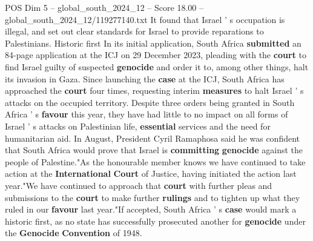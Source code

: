 \begin{textsample}{POS Dim 5 – global\_south\_2024\_12 – Score 18.00 – global\_south\_2024\_12/119277140.txt}
It found that Israel ' s occupation is illegal, and set out clear standards for Israel to provide reparations to Palestinians.
Historic first In its initial application, South Africa \textbf{submitted} an 84-page application at the ICJ on 29 December 2023, pleading with the \textbf{court} to find Israel guilty of suspected \textbf{genocide} and order it to, among other things, halt its invasion in Gaza.
Since launching the \textbf{case} at the ICJ, South Africa has approached the \textbf{court} four times, requesting interim \textbf{measures} to halt Israel ' s attacks on the occupied territory.
Despite three orders being granted in South Africa ' s \textbf{favour} this year, they have had little to no impact on all forms of Israel ' s attacks on Palestinian life, \textbf{essential} services and the need for humanitarian aid.
In August, President Cyril Ramaphosa said he was confident that South Africa would prove that Israel is \textbf{committing} \textbf{genocide} against the people of Palestine."As the honourable member knows we have continued to take action at the \textbf{International} \textbf{Court} of Justice, having initiated the action last year."We have continued to approach that \textbf{court} with further pleas and submissions to the \textbf{court} to make further \textbf{rulings} and to tighten up what they ruled in our \textbf{favour} last year."If accepted, South Africa ' s \textbf{case} would mark a historic first, as no state has successfully prosecuted another for \textbf{genocide} under the \textbf{Genocide} \textbf{Convention} of 1948.

\end{textsample}
